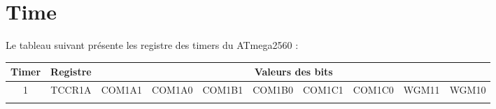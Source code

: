 \documentclass[TP, noCustomPackages]{UPSTI_Document}
\begin{document}
\section{Time}

Le tableau suivant présente les registre des timers du ATmega2560 :

\begin{center}
    \begin{tabular}{|c|c|p{1.5cm}|p{1.5cm}|p{1.5cm}|p{1.5cm}|p{1.5cm}|p{1.5cm}|p{1.5cm}|p{1.5cm}|}
        \hline
        Timer & Registre & \multicolumn{8}{c}{Valeurs des bits}                     \\
        \hline
        \multirow[c]{2}{*}{1}     & TCCR1A   &  COM1A1 & COM1A0 & COM1B1 & COM1B0 & COM1C1     & COM1C0      & WGM11  & WGM10  \\\hline
        & & & & & & & & & \\\hline

    \end{tabular}
\end{center}
\end{document}
